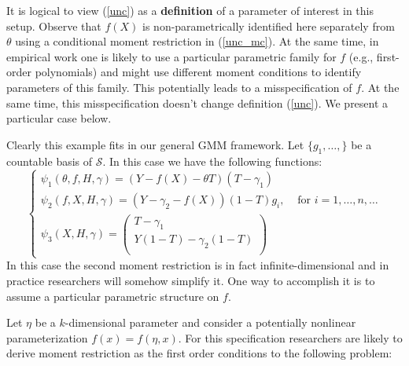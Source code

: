 \documentclass[12pt]{article}
\theoremstyle{plain}
\begin{document}
It is logical to view (\ref{unc}) as a \textbf{definition} of a parameter of interest in this setup. Observe that $f(X)$ is non-parametrically identified here separately from $\theta$ using a conditional moment restriction in (\ref{unc_mc}). At the same time, in empirical work one is likely to use a particular parametric family for $f$ (e.g., first-order polynomials) and might use different moment conditions to identify parameters of this family. This potentially leads to a misspecification of $f$. At the same time, this misspecification doesn't change definition (\ref{unc}). We present a particular case below.


Clearly this example fits in our general GMM framework. Let $\{g_1,\dots, \}$ be a countable basis of $\mathcal{S}$.  In this case we have the following functions:
\begin{equation}
\begin{cases}\label{true_unc}
\psi_1(\theta,f,H,\gamma) = (Y-f(X)-\theta T)(T-\gamma_1)&\\
\psi_2(f,X,H,\gamma) = (Y-\gamma_2-f(X))(1-T)g_i, &\text{ for $i = 1,\dots, n,\dots$}\\
\psi_3(X,H,\gamma) = \begin{pmatrix} T-\gamma_1\\ Y(1-T)-\gamma_2 (1-T)\\\end{pmatrix}&
\end{cases}
\end{equation}
In this case the second moment restriction is in fact infinite-dimensional and in practice researchers will somehow simplify it. One way to accomplish it is to assume a particular parametric structure on $f$. 

Let $\eta$ be a $k$-dimensional parameter and consider a potentially nonlinear parameterization $f(x) = f(\eta, x)$. For this specification researchers are likely to derive moment restriction as the first order conditions to the following problem:
\end{document}
